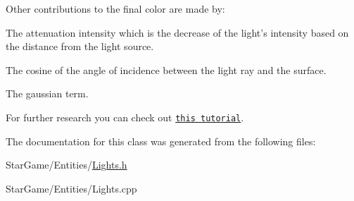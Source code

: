 Other contributions to the final color are made by\-:
\begin{DoxyItemize}
\item The {\ttfamily attenuation intensity} which is the decrease of the light's intensity based on the distance from the light source.
\item The cosine of the angle of incidence between the light ray and the surface.
\item The {\ttfamily gaussian term}.
\end{DoxyItemize}

For further research you can check out \href{http://www.arcsynthesis.org/gltut/Illumination/Illumination.html}{\tt this tutorial}. 

The documentation for this class was generated from the following files\-:\begin{DoxyCompactItemize}
\item 
Star\-Game/\-Entities/\hyperlink{_lights_8h}{Lights.\-h}\item 
Star\-Game/\-Entities/Lights.\-cpp\end{DoxyCompactItemize}
